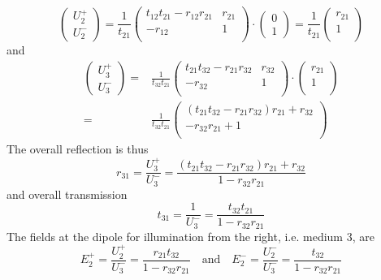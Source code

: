 \begin{equation}
\begin{pmatrix}
U_2^+ \\ U_2^-
\end{pmatrix}
=
\frac{1}{t_{21}}
\begin{pmatrix}
t_{12} t_{21} - r_{12}r_{21} & r_{21} \\ - r_{12} & 1 \\
\end{pmatrix} 
\cdot
\begin{pmatrix}
0 \\ 1
\end{pmatrix}
= 
\frac{1}{t_{21}}
\begin{pmatrix}
 r_{21} \\  1 \\
\end{pmatrix} 
\end{equation}
and 
\begin{align}
\begin{pmatrix}
U_3^+ \\ U_3^-
\end{pmatrix}
= & 
\frac{1}{t_{32} t_{21} }
\begin{pmatrix}
t_{21} t_{32} - r_{21}r_{32} & r_{32} \\ - r_{32} & 1 \\
\end{pmatrix} 
\cdot
\begin{pmatrix}
 r_{21} \\  1 \\
\end{pmatrix}  \\
= & 
\frac{1}{t_{32} t_{21} }
\begin{pmatrix}
(t_{21} t_{32} - r_{21}r_{32})  r_{21} +  r_{32} \\ - r_{32}  r_{21}  + 1 \\
\end{pmatrix} 
\end{align}
The overall reflection is thus
\begin{equation}
 r_{31} = \frac{U_3^+}{U_3^-}
 = \frac{(t_{21} t_{32} - r_{21}r_{32})  r_{21} +  r_{32}}{1 -r_{32}  r_{21}  }
\end{equation}
and overall transmission 
\begin{equation}
 t_{31} = \frac{1}{U_3^-}
 = \frac{t_{32} t_{21}  }{1 -r_{32}  r_{21}  }
\end{equation}
The fields at the dipole for illumination from the right, i.e. medium 3, are
\begin{equation}
E_2^+ = \frac{U_2^+}{U_3^-} 
= \frac{r_{21} t_{32}  }{1 -r_{32}  r_{21}  }
 \quad
 \text{and}
 \quad
 E_2^- = \frac{U_2^-}{U_3^-} 
  = \frac{t_{32}   }{1 -r_{32}  r_{21}  }
\end{equation}
